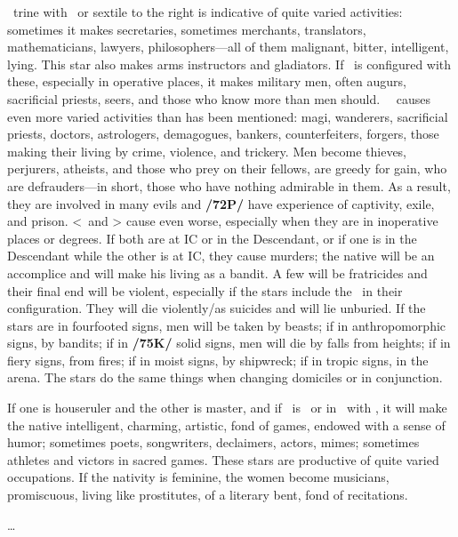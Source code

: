 \Mercury\, \marginnote{\Mercury \Trine \Mars} trine with \Mars\, or sextile to the right is indicative of quite varied activities: sometimes it makes secretaries, sometimes merchants, translators, mathematicians, lawyers, philosophers—all of them malignant, bitter, intelligent, lying. This star also makes arms instructors and gladiators. If \Jupiter\, is configured with these, especially in operative places, it makes military men, often augurs, sacrificial priests,
seers, and those who know more than men should. \Mercury\, \Square\, causes even more varied activities than has been mentioned: magi, wanderers, sacrificial priests, doctors, astrologers, demagogues, bankers, counterfeiters, forgers, those making their living by crime, violence, and trickery. Men become thieves, perjurers, atheists, and those who prey on their fellows, are greedy for gain, who are defrauders—in short, those who have nothing admirable in them. As a result, they are involved in many evils and \textbf{/72P/} have experience of captivity, exile, and prison. <\Mars\, and \Mercury> cause even worse, especially when they are in inoperative places or degrees. If both are at IC or in the Descendant, or if one is in the Descendant while the other is at  IC, they cause murders; the native will be an accomplice and will make his living as a
bandit. A few will be fratricides and their final end will be violent, especially if the stars include the \Moon\, in their configuration. They will die violently/as suicides and will lie unburied. If the stars are in fourfooted signs, men will be taken by beasts; if in anthropomorphic signs, by bandits; if in \textbf{/75K/} solid signs, men will die by falls from heights; if in fiery signs, from fires; if in moist signs, by shipwreck; if in tropic
signs, in the arena. \mndl The stars do the same things when changing domiciles or in conjunction. 

If one is houseruler and the other is master, and if \Mercury\, is \Sextile\, or in \Conjunction\, with \Venus, it will make the native intelligent, charming, artistic, fond of games, endowed with a sense of humor; sometimes poets, songwriters, declaimers, actors, mimes; sometimes athletes and victors in sacred games. These stars are productive of quite varied occupations. If the nativity is feminine, the women become musicians, promiscuous, living like prostitutes, of a literary bent, fond of recitations.

\ldots

